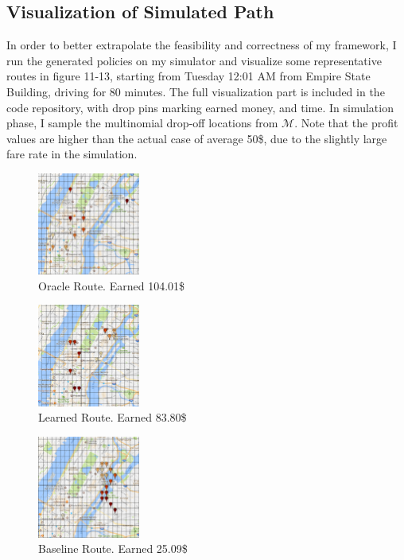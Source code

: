 \documentclass[letterpaper, 10 pt, conference]{ieeeconf}
\begin{document}
\subsection{Visualization of Simulated Path}
In order to better extrapolate the feasibility and correctness of my framework, I run the generated policies on my simulator and visualize some representative routes in figure 11-13, starting from Tuesday 12:01 AM from Empire State Building, driving for 80 minutes. The full visualization part is included in the code repository, with drop pins marking earned money, and time. In simulation phase, I sample the multinomial drop-off locations from $\mathcal{M}$. Note that the profit values are higher than the actual case of average 50\$, due to the slightly large fare rate in the simulation.
\begin{figure}
\centering
\includegraphics[width=0.3\textwidth]{oracle.png}
\caption{Oracle Route. Earned 104.01\$}
\end{figure}
\begin{figure}
\centering
\includegraphics[width=0.3\textwidth]{learned.png}
\caption{Learned Route. Earned 83.80\$}
\end{figure}
\begin{figure}
\centering
\includegraphics[width=0.3\textwidth]{baseline.png}
\caption{Baseline Route. Earned 25.09\$}
\end{figure}
\end{document}
